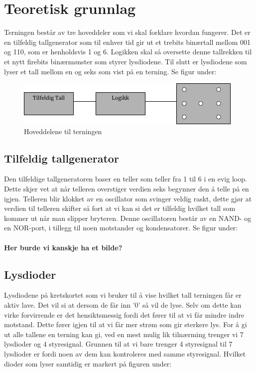 \documentclass[12pt,norsk,a4paper]{article}
\begin{document}
\clearpage

\section{Teoretisk grunnlag}
Terningen består av tre hoveddeler som vi skal forklare hvordan fungerer. Det er en tilfeldig tallgenerator som til enhver tid
gir ut et trebits binærtall mellom 001 og 110, som er henholdsvis 1 og 6. Logikken skal så oversette denne tallrekken til et nytt firebits binærmønster som styrer lysdiodene. Til slutt er lysdiodene som lyser et tall mellom en og seks som vist på en terning. Se figur under:
\begin{figure}[H]
\includegraphics{Blokkskjema.png}
\caption{Hoveddelene til terningen}
\label{fig:blokkskjema}
\end{figure}

    \subsection{Tilfeldig tallgenerator}
    Den tilfeldige tallgeneratoren baser en teller som teller fra 1 til 6 i en evig loop. Dette skjer vet at når telleren overstiger verdien seks begynner den å telle på en igjen. Telleren blir klokket av en oscillator som svinger
    veldig raskt, dette gjør at verdien til telleren skifter så fort at vi kan si det er tilfeldig hvilket tall som kommer ut når man slipper bryteren. Denne oscillatoren består av en NAND- og en NOR-port, i tillegg til noen motstander og kondensatorer. Se figur under:
    \\
    \\
    \textbf{Her burde vi kanskje ha et bilde?} 

    
    \subsection{Lysdioder}
    Lysdiodene på kretskortet som vi bruker til å vise hvilket tall terningen får er aktiv lave. Det vil si at dersom de får inn '0'
    så vil de lyse. Selv om dette kan virke forvirrende er det hensiktsmessig fordi det fører til at vi får mindre indre motstand. Dette fører igjen til at vi får mer strøm som gir sterkere lys. For å gi ut alle tallene en terning kan gi, ved en mest mulig lik tilnærming trenger vi 7 lysdioder og 4 styresignal. Grunnen til at vi bare trenger 4 styresignal til 7 lysdioder er fordi noen av dem kan kontroleres med samme styresignal. Hvilket dioder som lyser samtidig er markert på figuren under:
\end{document}
